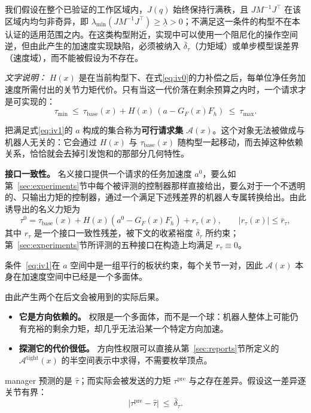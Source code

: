 \documentclass[journal]{IEEEtran}
\begin{document}
我们假设在整个已验证的工作区域内，$J(q)$ 始终保持行满秩，且 $JM^{-1}J^\top$ 在该区域内均匀非奇异，即 $\lambda_{\min}(JM^{-1}J^\top)\ge\underline\lambda>0$；不满足这一条件的构型不在本认证的适用范围之内。在这类构型附近，实现中可以使用一个阻尼化的操作空间逆，但由此产生的加速度实现缺陷，必须被纳入 $\bar\delta_\tau$（力矩域）或单步模型误差界（速度域），而不能被假设为不存在。

\emph{文字说明：} $H(x)$ 是在当前构型下、在式\eqref{eq:iv0}的力补偿之后，每单位净任务加速度所需付出的关节力矩代价。只有当这一代价落在剩余预算之内时，一个请求才是可实现的：
\begin{equation}
\tau_{\min}\ \le\ \tau_{\mathrm{base}}(x)+H(x)\,(a-G_F(x)F_h)\ \le\ \tau_{\max}.
\label{eq:iv1}
\end{equation}

把满足式\eqref{eq:iv1}的 $a$ 构成的集合称为\textbf{可行请求集} $\mathcal A(x)$。这个对象无法被做成与机器人无关的：它会通过 $H(x)$ 与 $\tau_{\mathrm{base}}(x)$ 随构型一起移动，而去掉这种依赖关系，恰恰就会去掉引发饱和的那部分几何特性。

\textbf{接口一致性。} 名义接口提供一个请求的任务加速度 $a^0$，要么如第~\ref{sec:experiments}节中每个被评测的控制器那样直接给出，要么对于一个不透明的、只输出力矩的控制器，通过一个满足下述残差界的机器人专属转换给出。由此诱导出的名义力矩为
\[
\tau^0=\tau_{\mathrm{base}}(x)+H(x)(a^0-G_F(x)F_h)+r_\tau(x),
\qquad
|r_\tau(x)|\le\bar r_\tau,
\]
其中 $r_\tau$ 是一个接口一致性残差，被下文的收紧裕度 $\bar\delta_\tau$ 所约束；第~\ref{sec:experiments}节所评测的五种接口在构造上均满足 $r_\tau\equiv0$。

条件~\eqref{eq:iv1}在 $a$ 空间中是一组平行的板状约束，每个关节一对，因此 $\mathcal A(x)$ 本身在加速度空间中已经是一个多面体。

由此产生两个在后文会被用到的实际后果。
\begin{itemize}
\item \textbf{它是方向依赖的。} 权限是一个多面体，而不是一个球：机器人整体上可能仍有充裕的剩余力矩，却几乎无法沿某一个特定方向加速。
\item \textbf{探测它的代价很低。} 方向性权限可以直接从第~\ref{sec:reports}节所定义的 $\mathcal A^{\mathrm{tight}}(x)$ 的半空间表示中求得，不需要枚举顶点。
\end{itemize}

manager 预测的是 $\hat\tau$；而实际会被发送的力矩 $\tau^{\mathrm{pre}}$ 与之存在差异。假设这一差异逐关节有界：
\begin{equation}
\left|\tau^{\mathrm{pre}}-\hat\tau\right|\ \le\ \bar\delta_\tau.
\label{eq:iv2}
\end{equation}
\end{document}
